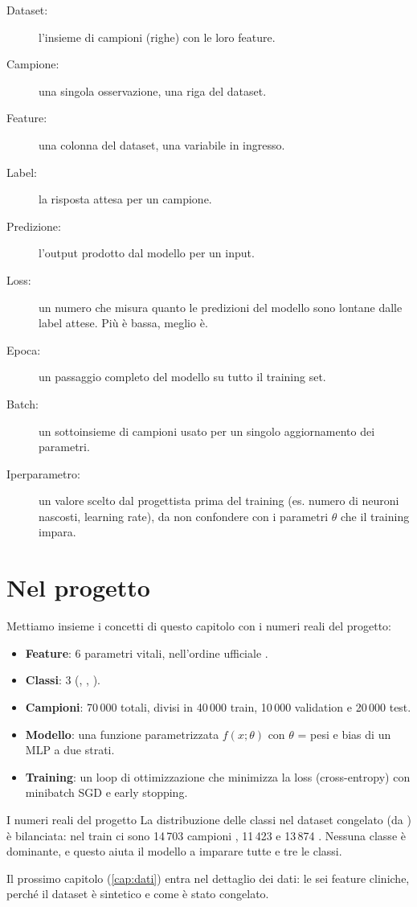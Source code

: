 \begin{description}
  \item[Dataset:] l'insieme di campioni (righe) con le loro feature.
  \item[Campione:] una singola osservazione, una riga del dataset.
  \item[Feature:] una colonna del dataset, una variabile in ingresso.
  \item[Label:] la risposta attesa per un campione.
  \item[Predizione:] l'output prodotto dal modello per un input.
  \item[Loss:] un numero che misura quanto le predizioni del modello sono
        lontane dalle label attese. Più è bassa, meglio è.
  \item[Epoca:] un passaggio completo del modello su tutto il training set.
  \item[Batch:] un sottoinsieme di campioni usato per un singolo
        aggiornamento dei parametri.
  \item[Iperparametro:] un valore scelto dal progettista prima del training
        (es. numero di neuroni nascosti, learning rate), da non confondere
        con i parametri $\theta$ che il training impara.
\end{description}

\section{Nel progetto}\label{sec:nel-progetto}

Mettiamo insieme i concetti di questo capitolo con i numeri reali del
progetto:

\begin{itemize}
  \item \textbf{Feature}: 6 parametri vitali, nell'ordine ufficiale
        .
  \item \textbf{Classi}: 3 (, , ).
  \item \textbf{Campioni}: 70\,000 totali, divisi in 40\,000 train, 10\,000
        validation e 20\,000 test.
  \item \textbf{Modello}: una funzione parametrizzata $f(x; \theta)$ con
        $\theta$ = pesi e bias di un MLP a due strati.
  \item \textbf{Training}: un loop di ottimizzazione che minimizza la loss
        (cross-entropy) con minibatch SGD e early stopping.
\end{itemize}

\begin{esempio}{I numeri reali del progetto}
La distribuzione delle classi nel dataset congelato (da
) è bilanciata: nel train ci sono 14\,703
campioni , 11\,423  e 13\,874 .
Nessuna classe è dominante, e questo aiuta il modello a imparare tutte e tre
le classi.
\end{esempio}

Il prossimo capitolo (\ref{cap:dati}) entra nel dettaglio dei dati: le sei
feature cliniche, perché il dataset è sintetico e come è stato congelato.